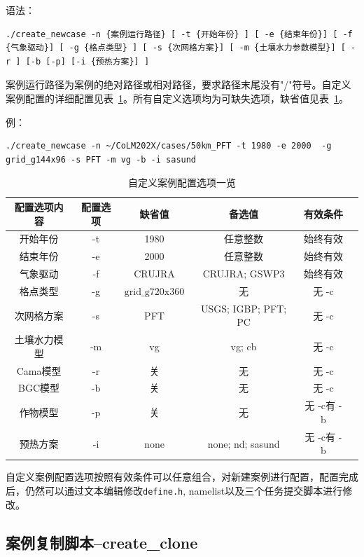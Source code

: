 语法：
\begin{lstlisting}
./create_newcase -n {案例运行路径} [ -t {开始年份} ] [ -e {结束年份}] [ -f {气象驱动}] [ -g {格点类型} ] [ -s {次网格方案}] [ -m {土壤水力参数模型}] [ -r ] [-b [-p] [-i {预热方案}] ]
\end{lstlisting}

案例运行路径为案例的绝对路径或相对路径，要求路径末尾没有"/"符号。自定义案例配置的详细配置见表~\ref{tab:custom_option}。所有自定义选项均为可缺失选项，缺省值见表~\ref{tab:custom_option}。

例：
\begin{lstlisting}
./create_newcase -n ~/CoLM202X/cases/50km_PFT -t 1980 -e 2000  -g grid_g144x96 -s PFT -m vg -b -i sasund
\end{lstlisting}

\begin{table}[!htbp]
\renewcommand{\arraystretch}{1.5}
\centering
\caption{自定义案例配置选项一览}\label{tab:custom_option}
\begin{tabular}{
cccccc} \toprule
\textbf{配置选项内容} & \textbf{配置选项} & \textbf{缺省值} & \textbf{备选值} & \textbf{有效条件}\\ \midrule
开始年份 & -t & 1980 & 任意整数 & 始终有效\\
结束年份 & -e & 2000 & 任意整数 & 始终有效\\
气象驱动 & -f & CRUJRA & CRUJRA; GSWP3  & 始终有效\\
格点类型 & -g & $\mathrm{grid}\_\mathrm{g}720\mathrm{x}360$ & 无& 无 -c\\
次网格方案 & -s & PFT & USGS; IGBP; PFT; PC & 无 -c\\
土壤水力模型 & -m & vg & vg; cb& 无 -c\\
Cama模型 & -r & 关 & 无& 无 -c\\
BGC模型 & -b & 关 & 无& 无 -c\\
作物模型 & -p & 关 & 无& 无 -c有 -b\\
预热方案 & -i & none & none; nd; sasund& 无 -c有 -b\\
\bottomrule
\end{tabular}
\end{table}

自定义案例配置选项按照有效条件可以任意组合，对新建案例进行配置，配置完成后，仍然可以通过文本编辑修改\texttt{define.h}, namelist以及三个任务提交脚本进行修改。

\subsection{案例复制脚本--create\_clone}

